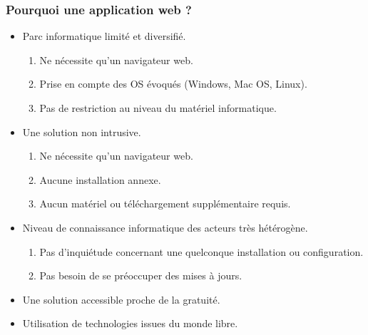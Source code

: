 \begin{frame}
  \frametitle{Pourquoi une application web ?}
  \begin{itemize}
    \item Parc informatique limité et diversifié.
      \begin{enumerate}
        \item Ne nécessite qu'un navigateur web.
        \item Prise en compte des OS évoqués (Windows, Mac OS, Linux).
        \item Pas de restriction au niveau du matériel informatique.
      \end{enumerate}
    \item Une solution non intrusive.
      \begin{enumerate}
        \item Ne nécessite qu'un navigateur web.
        \item Aucune installation annexe.
        \item Aucun matériel ou téléchargement supplémentaire requis.
      \end{enumerate}
    \item Niveau de connaissance informatique des acteurs très hétérogène.
      \begin{enumerate}
        \item Pas d'inquiétude concernant une quelconque installation ou configuration.
        \item Pas besoin de se préoccuper des mises à jours.  
      \end{enumerate}
    \item Une solution accessible proche de la gratuité.
    \item Utilisation de technologies issues du monde libre.
  \end{itemize}
\end{frame}

